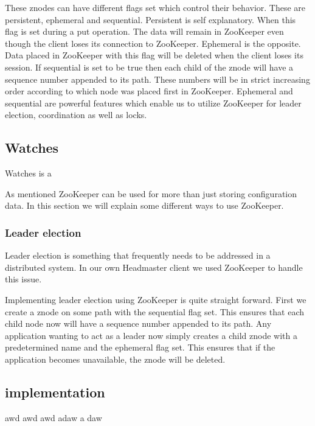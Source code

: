 These znodes can have different flags set which control their behavior. These are persistent, ephemeral and sequential. Persistent is self explanatory. When this flag is set during a put operation. The data will remain in ZooKeeper even though the client loses its connection to ZooKeeper. Ephemeral is the opposite. Data placed in ZooKeeper with this flag will be deleted when the client loses its session. If sequential is set to be true then each child of the znode will have a sequence number appended to its path. These numbers will be in strict increasing order according to which node was placed first in ZooKeeper. Ephemeral and sequential are powerful features which enable us to utilize ZooKeeper for leader election, coordination as well as locks. 


\subsection{Watches}
Watches is a 





As mentioned ZooKeeper can be used for more than just storing configuration data. In this section we will explain some different ways to use ZooKeeper.



\subsubsection{Leader election}
Leader election is something that frequently needs to be addressed in a distributed system. In our own Headmaster client we used ZooKeeper to handle this issue. 

Implementing leader election using ZooKeeper is quite straight forward. First we create a znode on some path with the sequential flag set. This ensures that each child node now will have a sequence number appended to its path. Any application wanting to act as a leader now simply creates a child znode with a predetermined name and the ephemeral flag set. This ensures that if the application becomes unavailable, the znode will be deleted.   


\subsection{implementation}
awd awd awd  adaw a daw

 
